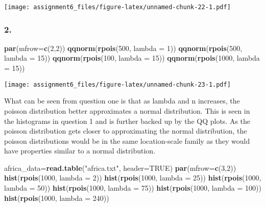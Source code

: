 \documentclass[11pt,]{article}
\newenvironment{Shaded}{\begin{snugshade}}{\end{snugshade}}
\newcommand{\KeywordTok}[1]{\textcolor[rgb]{0.13,0.29,0.53}{\textbf{{#1}}}}
\newcommand{\DataTypeTok}[1]{\textcolor[rgb]{0.13,0.29,0.53}{{#1}}}
\newcommand{\DecValTok}[1]{\textcolor[rgb]{0.00,0.00,0.81}{{#1}}}
\newcommand{\StringTok}[1]{\textcolor[rgb]{0.31,0.60,0.02}{{#1}}}
\newcommand{\OtherTok}[1]{\textcolor[rgb]{0.56,0.35,0.01}{{#1}}}
\newcommand{\NormalTok}[1]{{#1}}
\begin{document}
\texttt{[image: assignment6\_files/figure-latex/unnamed-chunk-22-1.pdf]}

\subsubsection{2.}\label{section-16}

\begin{Shaded}
\begin{Highlighting}[]
\KeywordTok{par}\NormalTok{(}\DataTypeTok{mfrow=}\KeywordTok{c}\NormalTok{(}\DecValTok{2}\NormalTok{,}\DecValTok{2}\NormalTok{))}
\KeywordTok{qqnorm}\NormalTok{(}\KeywordTok{rpois}\NormalTok{(}\DecValTok{500}\NormalTok{, }\DataTypeTok{lambda =} \DecValTok{1}\NormalTok{))}
\KeywordTok{qqnorm}\NormalTok{(}\KeywordTok{rpois}\NormalTok{(}\DecValTok{500}\NormalTok{, }\DataTypeTok{lambda =} \DecValTok{15}\NormalTok{))}
\KeywordTok{qqnorm}\NormalTok{(}\KeywordTok{rpois}\NormalTok{(}\DecValTok{100}\NormalTok{, }\DataTypeTok{lambda =} \DecValTok{15}\NormalTok{))}
\KeywordTok{qqnorm}\NormalTok{(}\KeywordTok{rpois}\NormalTok{(}\DecValTok{1000}\NormalTok{, }\DataTypeTok{lambda =} \DecValTok{15}\NormalTok{))}
\end{Highlighting}
\end{Shaded}

\texttt{[image: assignment6\_files/figure-latex/unnamed-chunk-23-1.pdf]}

What can be seen from question one is that as lambda and n increases,
the poisson distribution better approximates a normal distribution. This
is seen in the histograms in question 1 and is further backed up by the
QQ plots. As the poisson distribution gets closer to approximating the
normal distribution, the poisson distributions would be in the same
location-scale family as they would have properties similar to a normal
distribution.

\begin{Shaded}
\begin{Highlighting}[]
\NormalTok{africa_data=}\KeywordTok{read.table}\NormalTok{(}\StringTok{"africa.txt"}\NormalTok{, }\DataTypeTok{header=}\OtherTok{TRUE}\NormalTok{)}
\KeywordTok{par}\NormalTok{(}\DataTypeTok{mfrow=}\KeywordTok{c}\NormalTok{(}\DecValTok{3}\NormalTok{,}\DecValTok{2}\NormalTok{))}
\KeywordTok{hist}\NormalTok{(}\KeywordTok{rpois}\NormalTok{(}\DecValTok{1000}\NormalTok{, }\DataTypeTok{lambda =} \DecValTok{2}\NormalTok{))}
\KeywordTok{hist}\NormalTok{(}\KeywordTok{rpois}\NormalTok{(}\DecValTok{1000}\NormalTok{, }\DataTypeTok{lambda =} \DecValTok{25}\NormalTok{))}
\KeywordTok{hist}\NormalTok{(}\KeywordTok{rpois}\NormalTok{(}\DecValTok{1000}\NormalTok{, }\DataTypeTok{lambda =} \DecValTok{50}\NormalTok{))}
\KeywordTok{hist}\NormalTok{(}\KeywordTok{rpois}\NormalTok{(}\DecValTok{1000}\NormalTok{, }\DataTypeTok{lambda =} \DecValTok{75}\NormalTok{))}
\KeywordTok{hist}\NormalTok{(}\KeywordTok{rpois}\NormalTok{(}\DecValTok{1000}\NormalTok{, }\DataTypeTok{lambda =} \DecValTok{100}\NormalTok{))}
\KeywordTok{hist}\NormalTok{(}\KeywordTok{rpois}\NormalTok{(}\DecValTok{1000}\NormalTok{, }\DataTypeTok{lambda =} \DecValTok{240}\NormalTok{))}
\end{Highlighting}
\end{Shaded}
\end{document}
